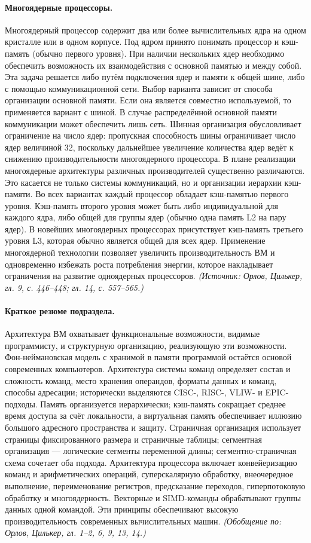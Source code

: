 \documentclass[a4paper,12pt]{article}
\begin{document}
\paragraph{Многоядерные процессоры.}
Многоядерный процессор содержит два или более вычислительных ядра на одном кристалле или в одном корпусе. Под ядром принято понимать процессор и кэш-память (обычно первого уровня). При наличии нескольких ядер необходимо обеспечить возможность их взаимодействия с основной памятью и между собой. Эта задача решается либо путём подключения ядер и памяти к общей шине, либо с помощью коммуникационной сети. Выбор варианта зависит от способа организации основной памяти. Если она является совместно используемой, то применяется вариант с шиной. В случае распределённой основной памяти коммуникации может обеспечить лишь сеть. Шинная организация обусловливает ограничение на число ядер: пропускная способность шины ограничивает число ядер величиной 32, поскольку дальнейшее увеличение количества ядер ведёт к снижению производительности многоядерного процессора. В плане реализации многоядерные архитектуры различных производителей существенно различаются. Это касается не только системы коммуникаций, но и организации иерархии кэш-памяти. Во всех вариантах каждый процессор обладает кэш-памятью первого уровня. Кэш-память второго уровня может быть либо индивидуальной для каждого ядра, либо общей для группы ядер (обычно одна память L2 на пару ядер). В новейших многоядерных процессорах присутствует кэш-память третьего уровня L3, которая обычно является общей для всех ядер. Применение многоядерной технологии позволяет увеличить производительность ВМ и одновременно избежать роста потребления энергии, которое накладывает ограничения на развитие одноядерных процессоров.
\textit{(Источник: Орлов, Цилькер, гл. 9, с. 446--448; гл. 14, с. 557--565.)}

\paragraph{Краткое резюме подраздела.}
Архитектура ВМ охватывает функциональные возможности, видимые программисту, и структурную организацию, реализующую эти возможности. Фон-неймановская модель с хранимой в памяти программой остаётся основой современных компьютеров. Архитектура системы команд определяет состав и сложность команд, место хранения операндов, форматы данных и команд, способы адресации; исторически выделяются CISC-, RISC-, VLIW- и EPIC-подходы. Память организуется иерархически; кэш-память сокращает среднее время доступа за счёт локальности, а виртуальная память обеспечивает иллюзию большого адресного пространства и защиту. Страничная организация использует страницы фиксированного размера и страничные таблицы; сегментная организация --- логические сегменты переменной длины; сегментно-страничная схема сочетает оба подхода. Архитектура процессора включает конвейеризацию команд и арифметических операций, суперскалярную обработку, внеочередное выполнение, переименование регистров, предсказание переходов, гиперпотоковую обработку и многоядерность. Векторные и SIMD-команды обрабатывают группы данных одной командой. Эти принципы обеспечивают высокую производительность современных вычислительных машин.
\textit{(Обобщение по: Орлов, Цилькер, гл. 1--2, 6, 9, 13, 14.)}
\end{document}
